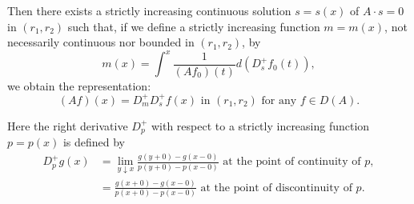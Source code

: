 Then there exists a strictly increasing continuous solution $s = s(x)$ of $A \cdot s = 0$ in $(r_1, r_2)$ such that, if we define a strictly increasing function $m = m(x)$, not necessarily continuous nor bounded in $(r_1, r_2)$, by 
\begin{equation}\label{eq:XIII.6.8}
m (x) = \int^{x} \frac {1}{(A f _{0}) (t)} d \left(D _{s} ^{+} f _{0} (t)\right),
\end{equation}
we obtain the representation: 
\begin{equation}\label{eq:XIII.6.9}
(A f) (x) = D _{m} ^{+} D _{s} ^{+} f (x) \text{ in } (r _{1}, r _{2}) \text{ for any } f \in D (A).
\end{equation}

Here the right derivative $D_{p}^{+}$ with respect to a strictly increasing function $p = p(x)$ is defined by 
\begin{equation}\label{eq:XIII.6.10}
\begin{aligned} D _{p} ^{+} g (x) & = \lim\limits _{y \downarrow x} \frac {g (y + 0) - g (x - 0)}{p (y + 0) - p (x - 0)} \text{ at the point of continuity of } p, \\ & = \frac {g (x + 0) - g (x - 0)}{p (x + 0) - p (x - 0)} \text{ at the point of discontinuity of } p. \end{aligned}
\end{equation}

